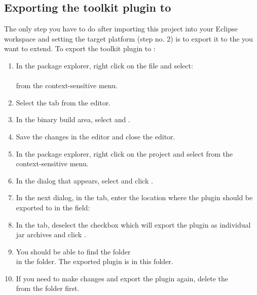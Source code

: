\subsection{Exporting the toolkit plugin to \app{}}
 The only step you have to do after importing this project into your Eclipse workspace and 
 setting the target platform (step no. 2) is to export it to the \app{} you want to 
 extend. To export the toolkit plugin to \app{}:

\begin{enumerate}
\item In the package explorer, right click on the  file and select:\\
\\
from the context-sensitive menu.
\item Select the  tab from the editor.
\item In the binary build area, select  and .
\item Save the changes in the editor and close the editor. 
\item In the package explorer, right click on the project and select  from the context-sensitive menu.
\item In the dialog that appears, select  and click .
\item In the next dialog, in the  tab, enter the location where the plugin should be exported to in the  field:\\
\item In the  tab, deselect the checkbox which will export the plugin as individual jar archives and click .
\item You should be able to find the folder \\  in the  folder. The exported plugin is in this folder. 
\item If you need to make changes and export the plugin again, delete the \\  from the  folder first.
\end{enumerate}

